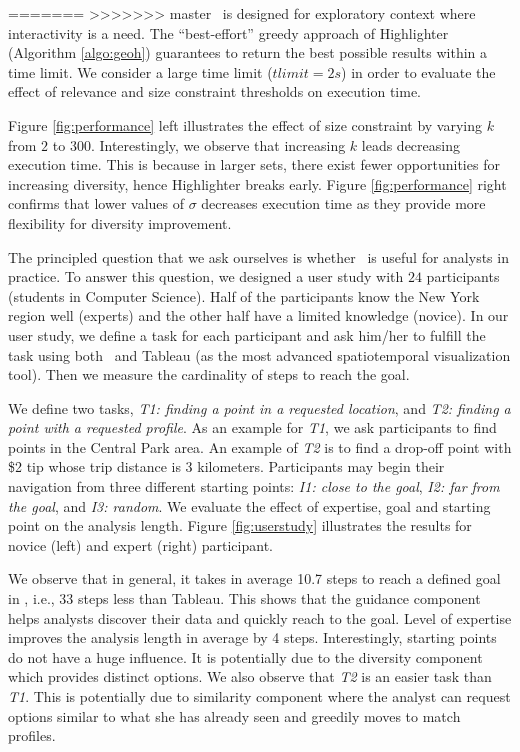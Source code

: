 =======
>>>>>>> master
\vspace{5pt}
 \framework\ is designed for exploratory context where interactivity is a need. The ``best-effort'' greedy approach of {\sc Highlighter} (Algorithm \ref{algo:geoh}) guarantees to return the best possible results within a time limit. We consider a large time limit ($tlimit = 2s$) in order to evaluate the effect of relevance and size constraint thresholds on execution time.

Figure \ref{fig:performance} left illustrates the effect of size constraint by varying $k$ from $2$ to $300$. Interestingly, we observe that increasing $k$ leads decreasing execution time. This is because in larger sets, there exist fewer opportunities for increasing diversity, hence {\sc Highlighter} breaks early. Figure \ref{fig:performance} right confirms that lower values of $\sigma$ decreases execution time as they provide more flexibility for diversity improvement.

\vspace{5pt}
The principled question that we ask ourselves is whether \framework\ is useful for analysts in practice. To answer this question, we designed a user study with $24$ participants (students in Computer Science). Half of the participants know the New York region well (experts) and the other half have a limited knowledge (novice). In our user study, we define a task for each participant and ask him/her to fulfill the task using both \framework\ and {\sc Tableau} (as the most advanced spatiotemporal visualization tool). Then we measure the cardinality of steps to reach the goal.

We define two tasks, {\em T1: finding a point in a requested location}, and {\em T2: finding a point with a requested profile}. As an example for {\em T1}, we ask participants to find points in the Central Park area. An example of {\em T2} is to find a drop-off point with \$2 tip whose trip distance is 3 kilometers. Participants may begin their navigation from three different starting points: {\em I1: close to the goal}, {\em I2: far from the goal}, and {\em I3: random}. We evaluate the effect of expertise, goal and starting point on the analysis length. Figure \ref{fig:userstudy} illustrates the results for novice (left) and expert (right) participant.

We observe that in general, it takes in average 10.7 steps to reach a defined goal in \framework, i.e., 33 steps less than {\sc Tableau}. This shows that the guidance component helps analysts discover their data and quickly reach to the goal. Level of expertise improves the analysis length in average by 4 steps. Interestingly, starting points do not have a huge influence. It is potentially due to the diversity component which provides distinct options. We also observe that {\em T2} is an easier task than {\em T1}. This is potentially due to similarity component where the analyst can request options similar to what she has already seen and greedily moves to match profiles.

